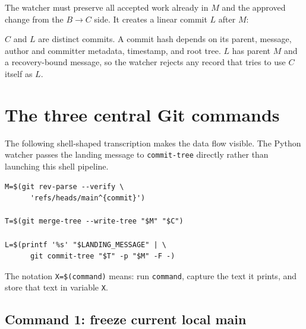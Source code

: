 \documentclass[10pt,twocolumn]{article}
\newcommand{\code}[1]{\texttt{#1}}
\begin{document}
The watcher must preserve all accepted work already in $M$ and the approved
change from the $B\rightarrow C$ side. It creates a linear commit $L$ after
$M$:

\begin{center}
\end{center}

$C$ and $L$ are distinct commits. A commit hash depends on its parent,
message, author and committer metadata, timestamp, and root tree. $L$ has
parent $M$ and a recovery-bound message, so the watcher rejects any record
that tries to use $C$ itself as $L$.

\section{The three central Git commands}

The following shell-shaped transcription makes the data flow visible. The
Python watcher passes the landing message to \code{commit-tree} directly
rather than launching this shell pipeline.

\begin{lstlisting}
M=$(git rev-parse --verify \
      'refs/heads/main^{commit}')

T=$(git merge-tree --write-tree "$M" "$C")

L=$(printf '%s' "$LANDING_MESSAGE" | \
      git commit-tree "$T" -p "$M" -F -)
\end{lstlisting}

The notation \code{X=\$(command)} means: run \code{command}, capture the text
it prints, and store that text in variable \code{X}.

\subsection{Command 1: freeze current local main}
\end{document}
